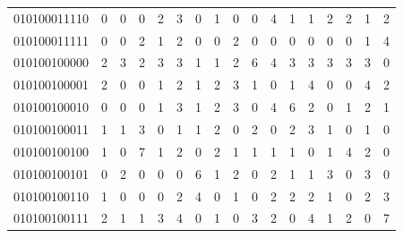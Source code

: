 \documentclass[10pt,a4paper]{article}
\begin{document}
\begin{longtable}{ |c|c|c|c|c|c|c|c|c|c|c|c|c|c|c|c|c| }
    010100011110              & 0                            & 0                                & 0                            & 2                              & 3   & 0   & 1   & 0   & 0   & 4   & 1   & 1   & 2   & 2   & 1   & 2   \\
    010100011111              & 0                            & 0                                & 2                            & 1                              & 2   & 0   & 0   & 2   & 0   & 0   & 0   & 0   & 0   & 0   & 1   & 4   \\
    010100100000              & 2                            & 3                                & 2                            & 3                              & 3   & 1   & 1   & 2   & 6   & 4   & 3   & 3   & 3   & 3   & 3   & 0   \\
    010100100001              & 2                            & 0                                & 0                            & 1                              & 2   & 1   & 2   & 3   & 1   & 0   & 1   & 4   & 0   & 0   & 4   & 2   \\
    010100100010              & 0                            & 0                                & 0                            & 1                              & 3   & 1   & 2   & 3   & 0   & 4   & 6   & 2   & 0   & 1   & 2   & 1   \\
    010100100011              & 1                            & 1                                & 3                            & 0                              & 1   & 1   & 2   & 0   & 2   & 0   & 2   & 3   & 1   & 0   & 1   & 0   \\
    010100100100              & 1                            & 0                                & 7                            & 1                              & 2   & 0   & 2   & 1   & 1   & 1   & 1   & 0   & 1   & 4   & 2   & 0   \\
    010100100101              & 0                            & 2                                & 0                            & 0                              & 0   & 6   & 1   & 2   & 0   & 2   & 1   & 1   & 3   & 0   & 3   & 0   \\
    010100100110              & 1                            & 0                                & 0                            & 0                              & 2   & 4   & 0   & 1   & 0   & 2   & 2   & 2   & 1   & 0   & 2   & 3   \\
    010100100111              & 2                            & 1                                & 1                            & 3                              & 4   & 0   & 1   & 0   & 3   & 2   & 0   & 4   & 1   & 2   & 0   & 7   \\

\end{longtable}
\end{document}
